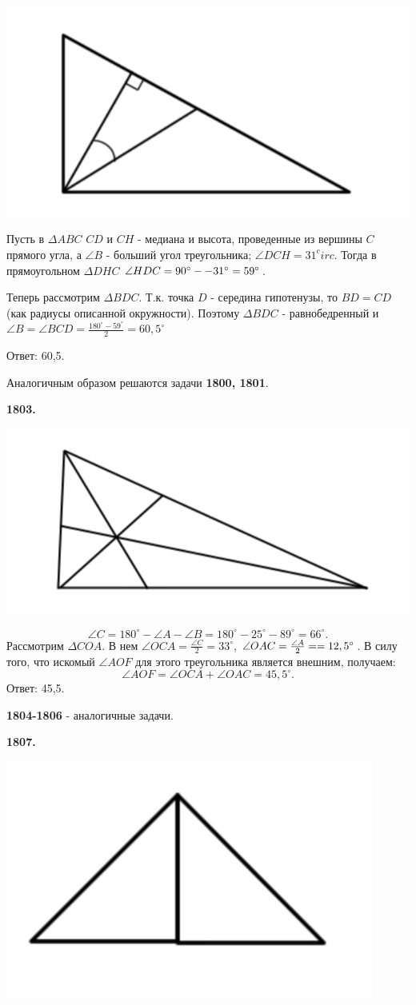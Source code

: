 {\centering \includegraphics[width=0.5\linewidth]{Geometry/Content/13.png}
	
}

Пусть в $\Delta ABC$ $CD$ и $CH$ - медиана и высота, проведенные из вершины $C$ прямого угла, а $\angle B$ - больший угол треугольника; $\angle DCH = 31^circ$. Тогда в прямоугольном $\Delta DHC$ $\angle HDC = 90^\circ - \linebreak -31^\circ = 59^\circ$. 

Теперь рассмотрим $\Delta BDC$. Т.к. точка $D$ - середина гипотенузы, то $BD = CD$ (как радиусы описанной окружности). Поэтому $\Delta BDC$ - равнобедренный и $\angle B = \angle BCD = \frac{180^\circ - 59^\circ}{2} = 60,5^\circ$

 \null \hspace*{\fill} Ответ: 60,5.

Аналогичным образом решаются задачи \textbf{1800, 1801}. 

\textbf{1803.}

{\centering \includegraphics[width=0.5\linewidth]{Geometry/Content/14.png}
	
}
\[
\angle C = 180^\circ - \angle A - \angle B = 180^\circ - 25^\circ - 89^\circ = 66^\circ.
\]
 Рассмотрим $\Delta COA$. В нем $\angle OCA = \frac{\angle C}{2} = 33^\circ$, $\angle OAC = \frac{\angle A}{2} = \linebreak = 12,5^\circ$. В силу того, что искомый $\angle AOF$ для этого треугольника является внешним, получаем:
\[
\angle AOF = \angle OCA + \angle OAC = 45,5^\circ.
\] \null \hspace*{\fill} Ответ: 45,5. 

\textbf{1804-1806} - аналогичные задачи.

\textbf{1807.}

{\centering \includegraphics[width=0.4\linewidth]{Geometry/Content/15.png}
	
}

